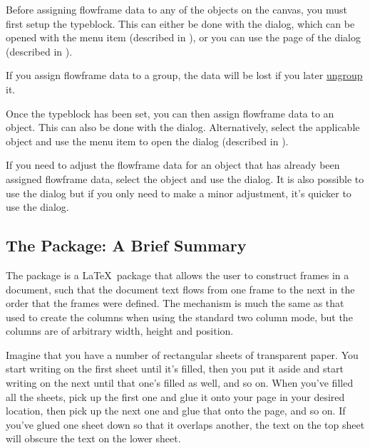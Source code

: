 Before assigning \gls{flowframe} data to any of the \glspl{object}
on the \gls{canvas}, you must first setup the \gls{typeblock}.
This can either be done with the  dialog, which can be
opened with the  menu item
(described in ), or you can use the 
 page of the  dialog
(described in ).

\begin{warning}
If you assign \gls{flowframe} data to a \gls{group}, the data will be lost
if you later \hyperref[sec:grouping]{ungroup} it.
\end{warning}

Once the \gls{typeblock} has been set, you can then assign
\gls{flowframe} data to an \gls{object}. This can also be done
with the  dialog. Alternatively, select the
applicable \gls{object} and use the 
menu item to open the  dialog (described in
).

If you need to adjust the \gls{flowframe} data for an \gls{object}
that has already been assigned \gls{flowframe} data, select the
\gls{object} and use the  dialog. It is also
possible to use the  dialog but if you only need
to make a minor adjustment, it's quicker to use the
 dialog.

\subsection{The  Package: A Brief Summary}
\label{sec:flowframesummary}

The  package is a \LaTeX\ package that allows
the user to construct frames in a document, such that the document
text flows from one frame to the next in the order that the
frames were defined. The mechanism is much the same as that used
to create the columns when using the standard two column mode, but
the columns are of arbitrary width, height and position.

Imagine that you have a number of rectangular sheets of transparent
paper. You start writing on the first sheet until it's filled, then
you put it aside and start writing on the next until that one's
filled as well, and so on. When you've filled all the sheets, pick
up the first one and glue it onto your page in your desired
location, then pick up the next one and glue that onto the page, and
so on. If you've glued one sheet down so that it overlaps another,
the text on the top sheet will obscure the text on the lower sheet.

